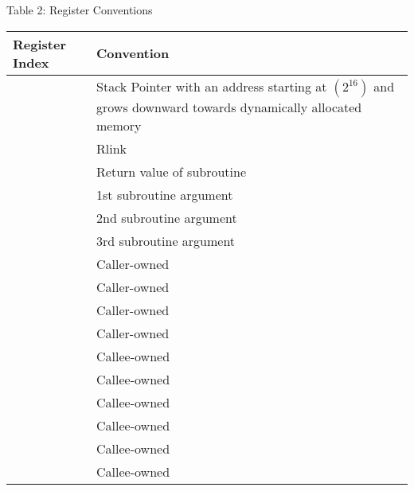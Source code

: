 \documentclass{article}
\begin{document}
\large{Table 2: Register Conventions}
\centering
\footnotesize
\renewcommand{\arraystretch}{1.4}
\begin{longtable}{ | l | P{2in} | }
\hline
\textbf{Register Index} & \textbf{Convention} \\
\hline
{} & Stack Pointer with an address starting at  $(2^{16})$ and grows downward towards dynamically allocated memory \\ \hline
{} & Rlink \\ \hline
{} & Return value of subroutine \\ \hline
{} & 1st subroutine argument \\ \hline
{} & 2nd subroutine argument \\ \hline
{} & 3rd subroutine argument \\ \hline
{} & Caller-owned \\ \hline
{} & Caller-owned \\ \hline
{} & Caller-owned \\ \hline
{} & Caller-owned \\ \hline
{} & Callee-owned \\ \hline
{} & Callee-owned \\ \hline
{} & Callee-owned \\ \hline
{} & Callee-owned \\ \hline
{} & Callee-owned \\ \hline
{} & Callee-owned \\ \hline
\end{longtable}
\end{document}
